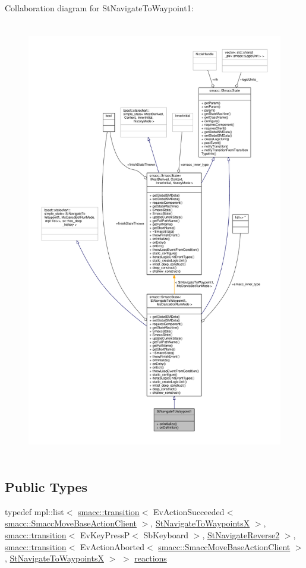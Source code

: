 Collaboration diagram for St\+Navigate\+To\+Waypoint1\+:
\nopagebreak
\begin{figure}[H]
\begin{center}
\leavevmode
\includegraphics[height=550pt]{structStNavigateToWaypoint1__coll__graph}
\end{center}
\end{figure}
\subsection*{Public Types}
\begin{DoxyCompactItemize}
\item 
typedef mpl\+::list$<$ \hyperlink{classsmacc_1_1transition}{smacc\+::transition}$<$ Ev\+Action\+Succeeded$<$ \hyperlink{classsmacc_1_1SmaccMoveBaseActionClient}{smacc\+::\+Smacc\+Move\+Base\+Action\+Client} $>$, \hyperlink{structStNavigateToWaypointsX}{St\+Navigate\+To\+WaypointsX} $>$, \hyperlink{classsmacc_1_1transition}{smacc\+::transition}$<$ Ev\+Key\+PressP$<$ Sb\+Keyboard $>$, \hyperlink{structStNavigateReverse2}{St\+Navigate\+Reverse2} $>$, \hyperlink{classsmacc_1_1transition}{smacc\+::transition}$<$ Ev\+Action\+Aborted$<$ \hyperlink{classsmacc_1_1SmaccMoveBaseActionClient}{smacc\+::\+Smacc\+Move\+Base\+Action\+Client} $>$, \hyperlink{structStNavigateToWaypointsX}{St\+Navigate\+To\+WaypointsX} $>$ $>$ \hyperlink{structStNavigateToWaypoint1_a6db6fed7b236ffe258ec296fc3d73b90}{reactions}
\end{DoxyCompactItemize}
